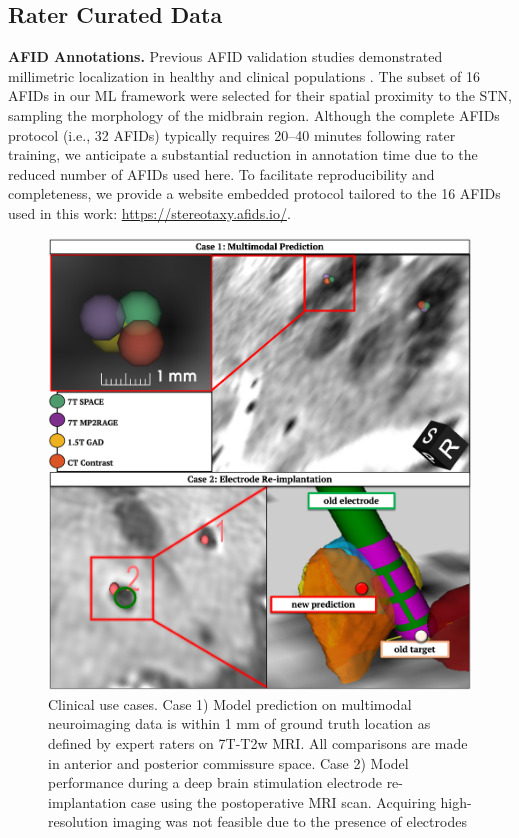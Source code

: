 \subsection{Rater Curated Data}
\textbf{AFID Annotations.} Previous AFID validation studies demonstrated millimetric localization in healthy \cite{Lau2019-eh} and clinical populations \cite{Abbass2022-lf}. The subset of 16 AFIDs in our ML framework were selected for their spatial proximity to the STN, sampling the morphology of the midbrain region. Although the complete AFIDs protocol (i.e., 32 AFIDs) typically requires 20–40 minutes following rater training, we anticipate a substantial reduction in annotation time due to the reduced number of AFIDs used here. To facilitate reproducibility and completeness, we provide a website embedded protocol tailored to the 16 AFIDs used in this work: \url{https://stereotaxy.afids.io/}.
\begin{figure}[hbt!]
    \centering
    \includegraphics[width=1\linewidth]{figs/ch4_Figure_clincase.png}
    \caption{Clinical use cases. Case 1) Model prediction on multimodal neuroimaging data is within 1 mm of ground truth location as defined by expert raters on 7T-T2w MRI. All comparisons are made in anterior and posterior commissure space. Case 2) Model performance during a deep brain stimulation electrode re-implantation case using the postoperative MRI scan. Acquiring high-resolution imaging was not feasible due to the presence of electrodes}
    \label{fig:ch4_Figure_clincase}
\end{figure}

